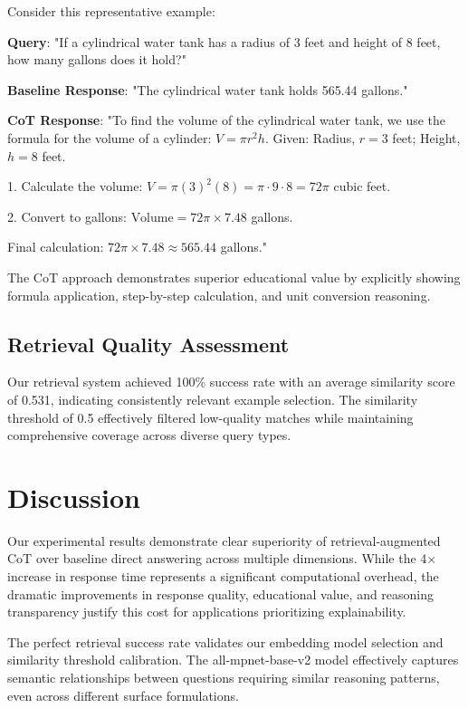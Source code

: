 \documentclass{article}
\begin{document}
Consider this representative example:

\textbf{Query}: "If a cylindrical water tank has a radius of 3 feet and height of 8 feet, how many gallons does it hold?"

\textbf{Baseline Response}: "The cylindrical water tank holds 565.44 gallons."

\textbf{CoT Response}: "To find the volume of the cylindrical water tank, we use the formula for the volume of a cylinder: \( V = \pi r^2 h \). Given: Radius, \( r = 3 \) feet; Height, \( h = 8 \) feet.

1. Calculate the volume:
\( V = \pi (3)^2 (8) = \pi \cdot 9 \cdot 8 = 72\pi \) cubic feet.

2. Convert to gallons:
\( \text{Volume} = 72\pi \times 7.48 \) gallons.

Final calculation:
\( 72\pi \times 7.48 \approx 565.44 \) gallons."


The CoT approach demonstrates superior educational value by explicitly showing formula application, step-by-step calculation, and unit conversion reasoning.

\subsection{Retrieval Quality Assessment}

Our retrieval system achieved 100\% success rate with an average similarity score of 0.531, indicating consistently relevant example selection. The similarity threshold of 0.5 effectively filtered low-quality matches while maintaining comprehensive coverage across diverse query types.

\section{Discussion}

Our experimental results demonstrate clear superiority of retrieval-augmented CoT over baseline direct answering across multiple dimensions. While the 4× increase in response time represents a significant computational overhead, the dramatic improvements in response quality, educational value, and reasoning transparency justify this cost for applications prioritizing explainability.

The perfect retrieval success rate validates our embedding model selection and similarity threshold calibration. The all-mpnet-base-v2 model effectively captures semantic relationships between questions requiring similar reasoning patterns, even across different surface formulations.
\end{document}
